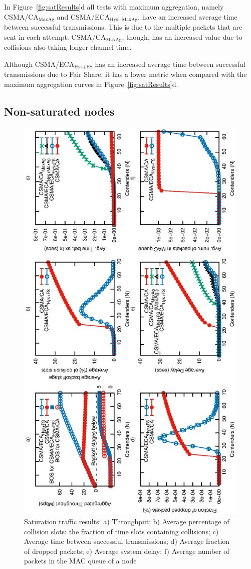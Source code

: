 	In Figure~\ref{fig:satResults}d all tests with maximum aggregation, namely CSMA/CA$_{\text{MaxAg}}$ and CSMA/ECA$_{\text{Hys+MaxAg}}$, have an increased average time between successful transmissions. This is due to the multiple packets that are sent in each attempt. CSMA/CA$_{\text{MaxAg}}$, though, has an increased value due to collisions also taking longer channel time.
	
	Although CSMA/ECA$_{\text{Hys+FS}}$ has an increased average time between successful transmissions due to Fair Share, it has a lower metric when compared with the maximum aggregation curves in Figure~\ref{fig:satResults}d.




	\subsection{Non-saturated nodes}\label{resultsUnsaturated}
	
	\begin{figure}[tb]
		\centering
		\includegraphics[width=0.5\linewidth,angle=-90]{figures/tonFigs/nonsaturation-combined.eps}
		\caption{Saturation traffic results: a) Throughput; b) Average percentage of collision slots: the fraction of time slots containing collisions; c) Average time between successful transmissions; d) Average fraction of dropped packets; e) Average system delay; f) Average number of packets in the MAC queue of a node}
		\label{fig:unsatResults}
	\end{figure}
	
